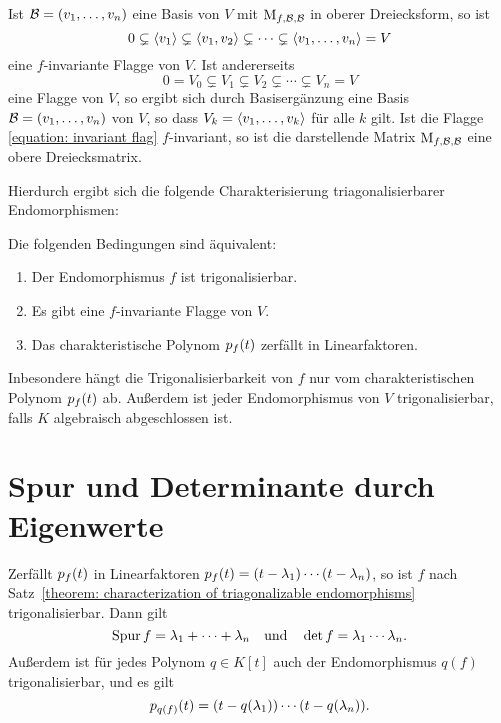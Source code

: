 Ist $\mathcal{B} = (v_1, \dotsc, v_n)$ eine Basis von $V$ mit $\operatorname{M}_{f, \mathcal{B}, \mathcal{B}}$ in oberer Dreiecksform, so ist
\[
              0
  \subsetneq  \left\langle v_1 \right\rangle
  \subsetneq  \left\langle v_1, v_2 \right\rangle
  \subsetneq  \dotsb
  \subsetneq  \left\langle v_1, \dotsc, v_n \right\rangle
  =           V
\]
eine $f$-invariante Flagge von $V$.
Ist andererseits
\begin{equation}
  \label{equation: invariant flag}
              0
  =           V_0
  \subsetneq  V_1
  \subsetneq  V_2
  \subsetneq  \dotsb
  \subsetneq  V_n
  =           V
\end{equation}
eine Flagge von $V$, so ergibt sich durch Basisergänzung eine Basis $\mathcal{B} = (v_1, \dotsc, v_n)$ von $V$, so dass $V_k = \left\langle v_1, \dotsc, v_k \right\rangle$ für alle $k$ gilt.
Ist die Flagge \eqref{equation: invariant flag} $f$-invariant, so ist die darstellende Matrix $\operatorname{M}_{f, \mathcal{B}, \mathcal{B}}$ eine obere Dreiecksmatrix.

Hierdurch ergibt sich die folgende Charakterisierung triagonalisierbarer Endomorphismen:

\begin{theorem}
  \label{theorem: characterization of triagonalizable endomorphisms}
  Die folgenden Bedingungen sind äquivalent:
  \begin{enumerate}
    \item
      Der Endomorphismus $f$ ist trigonalisierbar.
    \item
      Es gibt eine $f$-invariante Flagge von $V$.
    \item
      Das charakteristische Polynom $p_{f}(t)$ zerfällt in Linearfaktoren.
  \end{enumerate}
\end{theorem}

Inbesondere hängt die Trigonalisierbarkeit von $f$ nur vom charakteristischen Polynom $p_{f}(t)$ ab.
Außerdem ist jeder Endomorphismus von $V$ trigonalisierbar, falls $K$ algebraisch abgeschlossen ist.



\section{Spur und Determinante durch Eigenwerte}
\label{section: trace and determinant via eigenvalues}

Zerfällt $p_{f}(t)$ in Linearfaktoren $p_{f}(t) = (t - \lambda_1) \dotsm (t - \lambda_n)$, so ist $f$ nach Satz~\ref{theorem: characterization of triagonalizable endomorphisms} trigonalisierbar.
Dann gilt
\[
    \operatorname{Spur} f
  = \lambda_1 + \dotsb + \lambda_n
\quad\text{und}\quad
    \det f
  = \lambda_1 \dotsm \lambda_n.
\]
Außerdem ist für jedes Polynom $q \in K[t]$ auch der Endomorphismus $q(f)$ trigonalisierbar, und es gilt
\[
    p_{q(f)}(t)
  = (t - q(\lambda_1)) \dotsm (t - q(\lambda_n)).
\]





